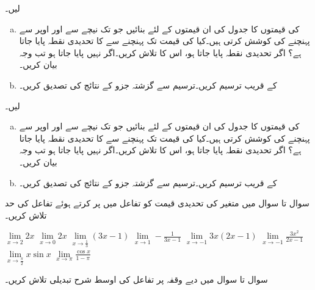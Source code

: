  لیں۔
\begin{enumerate}[a.]
\item
{} کی قیمتوں کا جدول  کی ان قیمتوں کے لئے بنائیں جو  تک نیچے سے اور اوپر سے پہنچنے کی کوشش کرتی ہیں۔کیا  کی قیمت  تک پہنچنے سے  کا تحدیدی نقطہ پایا جاتا ہے؟ اگر تحدیدی نقطہ پایا جاتا ہو، اس کا تلاش کریں۔اگر نہیں پایا جاتا ہو تب وجہ بیان کریں۔
\item
{} کے قریب  ترسیم کریں۔ترسیم سے گزشتہ جزو کے نتائج کی تصدیق کریں۔
\end{enumerate}
 لیں۔
\begin{enumerate}[a.]
\item
{} کی قیمتوں کا جدول  کی ان قیمتوں کے لئے بنائیں جو  تک نیچے سے اور اوپر سے پہنچنے کی کوشش کرتی ہیں۔کیا
  کی قیمت  تک پہنچنے سے  کا تحدیدی نقطہ پایا جاتا ہے؟ اگر تحدیدی نقطہ پایا جاتا ہو، اس کا تلاش کریں۔اگر نہیں پایا جاتا ہو تب وجہ بیان کریں۔
\item
{} کے قریب  ترسیم کریں۔ترسیم سے گزشتہ جزو کے نتائج کی تصدیق کریں۔
\end{enumerate}

سوال  تا سوال  میں متغیر  کی تحدیدی قیمت کو تفاعل میں پر کرتے ہوئے تفاعل کی حد تلاش کریں۔

$\lim\limits_{x\to 2} 2x$
$\lim\limits_{x\to 0} 2x$
$\lim\limits_{x\to \tfrac{1}{3}} (3x-1)$
$\lim\limits_{x\to 1} -\tfrac{1}{3x-1}$
$\lim\limits_{x\to -1} 3x(2x-1)$
$\lim\limits_{x\to -1} \tfrac{3x^2}{2x-1}$
$\lim\limits_{x\to \tfrac{\pi}{2}} x\sin x$
$\lim\limits_{x\to \pi} \tfrac{\cos x}{1-\pi}$


سوال  تا سوال  میں دیے وقفہ پر تفاعل کی اوسط شرح تبدیلی تلاش کریں۔

